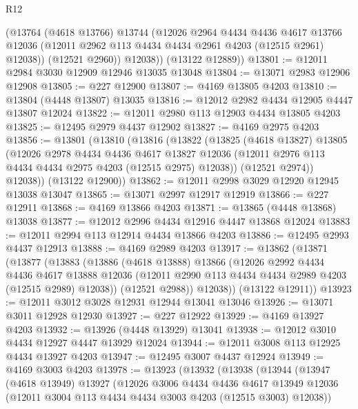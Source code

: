 \begin{lexlean}{R12}
\begin{coremodule}
          (@13764
            (@4618 @13766)
            @13744
            (@12026
              @2964
              @4434
              @4436
              @4617
              @13766
              @12036
              (@12011 @2962 @113 @4434 @4434 @2961 @4203 (@12515 @2961) @12038))
            (@12521 @2960))
          @12038))
      (@13122 @12889))
@13801 := @12011 @2984 @3030 @12909 @12946 @13035 @13048
@13804 := @13071 @2983 @12906 @12908
@13805 := @227 @12900
@13807 := @4169 @13805 @4203
@13810 := @13804 (@4448 @13807) @13035
@13816 := @12012 @2982 @4434 @12905 @4447 @13807 @12024
@13822 := @12011 @2980 @113 @12903 @4434 @13805 @4203
@13825 := @12495 @2979 @4437 @12902
@13827 := @4169 @2975 @4203
@13856 := @13801
    (@13810
      (@13816
        (@13822
          (@13825
            (@4618 @13827)
            @13805
            (@12026
              @2978
              @4434
              @4436
              @4617
              @13827
              @12036
              (@12011 @2976 @113 @4434 @4434 @2975 @4203 (@12515 @2975) @12038))
            (@12521 @2974))
          @12038))
      (@13122 @12900))
@13862 := @12011 @2998 @3029 @12920 @12945 @13038 @13047
@13865 := @13071 @2997 @12917 @12919
@13866 := @227 @12911
@13868 := @4169 @13866 @4203
@13871 := @13865 (@4448 @13868) @13038
@13877 := @12012 @2996 @4434 @12916 @4447 @13868 @12024
@13883 := @12011 @2994 @113 @12914 @4434 @13866 @4203
@13886 := @12495 @2993 @4437 @12913
@13888 := @4169 @2989 @4203
@13917 := @13862
    (@13871
      (@13877
        (@13883
          (@13886
            (@4618 @13888)
            @13866
            (@12026
              @2992
              @4434
              @4436
              @4617
              @13888
              @12036
              (@12011 @2990 @113 @4434 @4434 @2989 @4203 (@12515 @2989) @12038))
            (@12521 @2988))
          @12038))
      (@13122 @12911))
@13923 := @12011 @3012 @3028 @12931 @12944 @13041 @13046
@13926 := @13071 @3011 @12928 @12930
@13927 := @227 @12922
@13929 := @4169 @13927 @4203
@13932 := @13926 (@4448 @13929) @13041
@13938 := @12012 @3010 @4434 @12927 @4447 @13929 @12024
@13944 := @12011 @3008 @113 @12925 @4434 @13927 @4203
@13947 := @12495 @3007 @4437 @12924
@13949 := @4169 @3003 @4203
@13978 := @13923
    (@13932
      (@13938
        (@13944
          (@13947
            (@4618 @13949)
            @13927
            (@12026
              @3006
              @4434
              @4436
              @4617
              @13949
              @12036
              (@12011 @3004 @113 @4434 @4434 @3003 @4203 (@12515 @3003) @12038))

\end{coremodule}
\end{lexlean}
